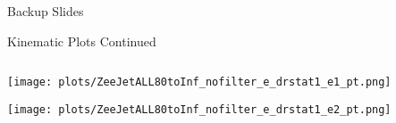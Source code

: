 \documentclass{beamer}
\begin{document}

\begin{frame}{}
  \huge{ Backup Slides }
\end{frame}


\begin{frame}{Kinematic Plots Continued}
  \begin{columns}

    \begin{column}{0.6\textwidth}
      \texttt{[image: plots/ZeeJetALL80toInf\_nofilter\_e\_drstat1\_e1\_pt.png]}

      \texttt{[image: plots/ZeeJetALL80toInf\_nofilter\_e\_drstat1\_e2\_pt.png]}
    \end{column}
  \end{columns}
\end{frame}
\end{document}
